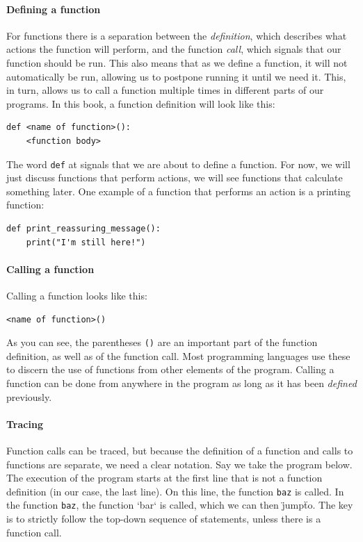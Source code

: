 \paragraph{Defining a function}

For functions there is a separation between the \emph{definition}, which describes what actions the function will perform, and the function \emph{call}, which signals that our function should be run. This also means that as we define a function, it will not automatically be run, allowing us to postpone running it until we need it. This, in turn, allows us to call a function multiple times in different parts of our programs. In this book, a function definition will look like this:

\begin{verbatim}
def <name of function>():
    <function body>
\end{verbatim}

The word \texttt{def} at signals that we are about to define a function. For now, we will just discuss functions that perform actions, we will see functions that calculate something later. One example of a function that performs an action is a printing function:

\begin{verbatim}
def print_reassuring_message():
    print("I'm still here!")
\end{verbatim}

\paragraph{Calling a function}

Calling a function looks like this:

\begin{verbatim}
<name of function>()
\end{verbatim}

As you can see, the parentheses \texttt{()} are an important part of the function definition, as well as of the function call. Most programming languages use these to discern the use of functions from other elements of the program. Calling a function can be done from anywhere in the program as long as it has been \emph{defined} previously.


\paragraph{Tracing} Function calls can be traced, but because the definition of a function and calls to functions are separate, we need a clear notation. Say we take the program below. The execution of the program starts at the first line that is not a function definition (in our case, the last line). On this line, the function \texttt{baz} is called. In the function \texttt{baz}, the function `bar` is called, which we can then \"jump\" to. The key is to strictly follow the top-down sequence of statements, unless there is a function call.

